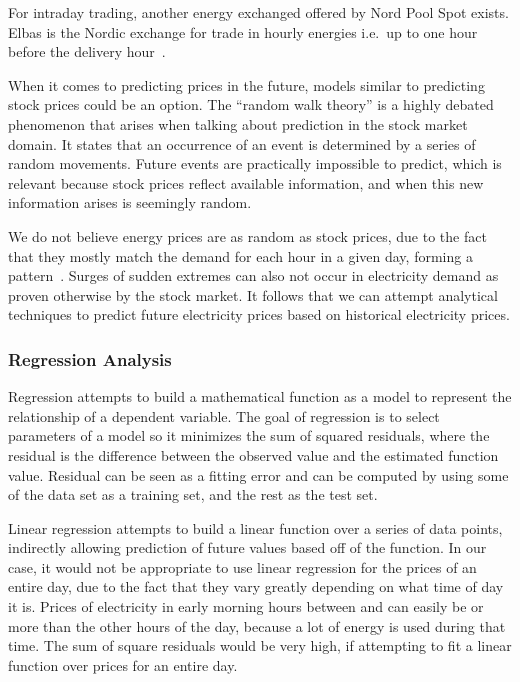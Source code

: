 For intraday trading, another energy exchanged offered by Nord Pool Spot exists. Elbas is the Nordic exchange for trade in hourly energies i.e.\ up to one hour before the delivery hour~\cite{ELBAS}.

When it comes to predicting prices in the future, models similar to predicting stock prices could be an option. The ``random walk theory'' is a highly debated phenomenon that arises when talking about prediction in the stock market domain. It states that an occurrence of an event is determined by a series of random movements. Future events are practically impossible to predict, which is relevant because stock prices reflect available information, and when this new information arises is seemingly random.

We do not believe energy prices are as random as stock prices, due to the fact that they mostly match the demand for each hour in a given day, forming a pattern~\cite{eiaElDemand}. Surges of sudden extremes can also not occur in electricity demand as proven otherwise by the stock market. It follows that we can attempt analytical techniques to predict future electricity prices based on historical electricity prices.

\subsubsection{Regression Analysis}
Regression attempts to build a mathematical function as a model to represent the relationship of a dependent variable. The goal of regression is to select parameters of a model so it minimizes the sum of squared residuals, where the residual is the difference between the observed value and the estimated function value. Residual can be seen as a fitting error and can be computed by using some of the data set as a training set, and the rest as the test set.

Linear regression attempts to build a linear function over a series of data points, indirectly allowing prediction of future values based off of the function. In our case, it would not be appropriate to use linear regression for the prices of an entire day, due to the fact that they vary greatly depending on what time of day it is. Prices of electricity in early morning hours between  and  can easily be  or more than the other hours of the day, because a lot of energy is used during that time. The sum of square residuals would be very high, if attempting to fit a linear function over prices for an entire day.

